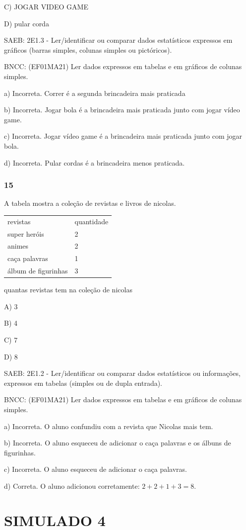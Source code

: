 C) JOGAR VIDEO GAME

D) pular corda

SAEB: 2E1.3 - Ler/identificar ou comparar dados estatísticos expressos
em gráficos (barras simples, colunas simples ou pictóricos).

BNCC: (EF01MA21) Ler dados expressos em tabelas e em gráficos de colunas
simples.

a) Incorreta. Correr é a segunda brincadeira mais praticada

b) Incorreta. Jogar bola é a brincadeira mais praticada junto com jogar
vídeo game.

c) Incorreta. Jogar vídeo game é a brincadeira mais praticada junto com
jogar bola.

d) Incorreta. Pular cordas é a brincadeira menos praticada.

\subsubsection{15 }\label{section-131}

A tabela mostra a coleção de revistas e livros de nicolas.

\begin{longtable}[]{@{}ll@{}}
\toprule
revistas & quantidade\tabularnewline
super heróis & 2\tabularnewline
animes & 2\tabularnewline
caça palavras & 1\tabularnewline
álbum de figurinhas & 3\tabularnewline
\bottomrule
\end{longtable}

quantas revistas tem na coleção de nicolas

A) 3

B) 4

C) 7

D) 8

SAEB: 2E1.2 - Ler/identificar ou comparar dados estatísticos ou
informações, expressos em tabelas (simples ou de dupla entrada).

BNCC: (EF01MA21) Ler dados expressos em tabelas e em gráficos de colunas
simples.

a) Incorreta. O aluno confundiu com a revista que Nicolas mais tem.

b) Incorreta. O aluno esqueceu de adicionar o caça palavras e os álbuns
de figurinhas.

c) Incorreta. O aluno esqueceu de adicionar o caça palavras.

d) Correta. O aluno adicionou corretamente: \(2 + 2 + 1 + 3 = 8\).

\section{SIMULADO 4}\label{simulado-4}

